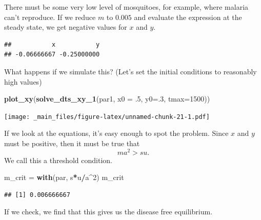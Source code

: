 \documentclass[
]{book}
\newenvironment{Shaded}{\begin{snugshade}}{\end{snugshade}}
\newcommand{\AttributeTok}[1]{\textcolor[rgb]{0.13,0.29,0.53}{#1}}
\newcommand{\DecValTok}[1]{\textcolor[rgb]{0.00,0.00,0.81}{#1}}
\newcommand{\FloatTok}[1]{\textcolor[rgb]{0.00,0.00,0.81}{#1}}
\newcommand{\FunctionTok}[1]{\textcolor[rgb]{0.13,0.29,0.53}{\textbf{#1}}}
\newcommand{\NormalTok}[1]{#1}
\newcommand{\OtherTok}[1]{\textcolor[rgb]{0.56,0.35,0.01}{#1}}
\newcommand{\SpecialCharTok}[1]{\textcolor[rgb]{0.81,0.36,0.00}{\textbf{#1}}}
\begin{document}
There must be some very low level of mosquitoes, for example, where malaria can't reproduce. If we reduce \(m\) to \(0.005\) and evaluate the expression at the steady state, we get negative values for \(x\) and \(y\).

\begin{Shaded}
\end{Shaded}

\begin{verbatim}
##           x           y 
## -0.06666667 -0.25000000
\end{verbatim}

What happens if we simulate this? (Let's set the initial conditions to reasonably high values)

\begin{Shaded}
\begin{Highlighting}[]
\FunctionTok{plot\_xy}\NormalTok{(}\FunctionTok{solve\_dts\_xy\_1}\NormalTok{(par1, }\AttributeTok{x0 =}\NormalTok{ .}\DecValTok{5}\NormalTok{, }\AttributeTok{y0=}\NormalTok{.}\DecValTok{3}\NormalTok{, }\AttributeTok{tmax=}\DecValTok{1500}\NormalTok{)) }
\end{Highlighting}
\end{Shaded}

\texttt{[image: \_main\_files/figure-latex/unnamed-chunk-21-1.pdf]}

If we look at the equations, it's easy enough to spot the problem. Since \(x\) and \(y\) must be positive, then it must be true that \[m a^2 > su.\] We call this a threshold condition.

\begin{Shaded}
\begin{Highlighting}[]
\NormalTok{m\_crit }\OtherTok{=} \FunctionTok{with}\NormalTok{(par, s}\SpecialCharTok{*}\NormalTok{u}\SpecialCharTok{/}\NormalTok{a}\SpecialCharTok{\^{}}\DecValTok{2}\NormalTok{)}
\NormalTok{m\_crit }
\end{Highlighting}
\end{Shaded}

\begin{verbatim}
## [1] 0.006666667
\end{verbatim}

If we check, we find that this gives us the disease free equilibrium.
\end{document}
